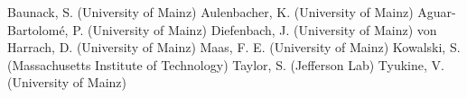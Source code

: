 Baunack, S. (University of Mainz)
Aulenbacher, K. (University of Mainz)
Aguar-Bartolom\'e, P. (University of Mainz)
Diefenbach, J. (University of Mainz)
von Harrach, D. (University of Mainz)
Maas, F. E. (University of Mainz)
Kowalski, S. (Massachusetts Institute of Technology)
Taylor, S. (Jefferson Lab)
Tyukine, V. (University of Mainz)
